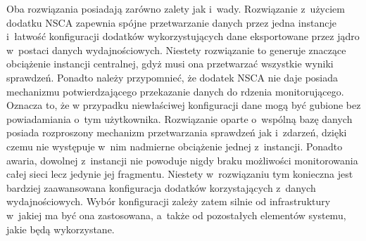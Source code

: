 Oba rozwiązania posiadają zarówno zalety jak i~wady. Rozwiązanie
z~użyciem dodatku NSCA zapewnia spójne przetwarzanie danych przez
jedna instancje i~łatwość konfiguracji dodatków wykorzystujących dane
eksportowane przez jądro w~postaci danych wydajnościowych. Niestety
rozwiązanie to generuje znaczące obciążenie instancji centralnej, gdyż
musi ona przetwarzać wszystkie wyniki sprawdzeń. Ponadto należy
przypomnieć, że dodatek NSCA nie daje posiada mechanizmu
potwierdzającego przekazanie danych do rdzenia monitorującego. Oznacza
to, że w przypadku niewłaściwej konfiguracji dane mogą być gubione bez
powiadamiania o~tym użytkownika. Rozwiązanie oparte o~wspólną bazę
danych posiada rozproszony mechanizm przetwarzania sprawdzeń jak
i~zdarzeń, dzięki czemu nie występuje w~nim nadmierne obciążenie
jednej z~instancji. Ponadto awaria, dowolnej z~instancji nie powoduje
nigdy braku możliwości monitorowania całej sieci lecz jedynie jej
fragmentu. Niestety w~rozwiązaniu tym konieczna jest bardziej
zaawansowana konfiguracja dodatków korzystających z~danych
wydajnościowych. Wybór konfiguracji zależy zatem silnie od
infrastruktury w~jakiej ma być ona zastosowana, a~także od pozostałych
elementów systemu, jakie będą wykorzystane.


